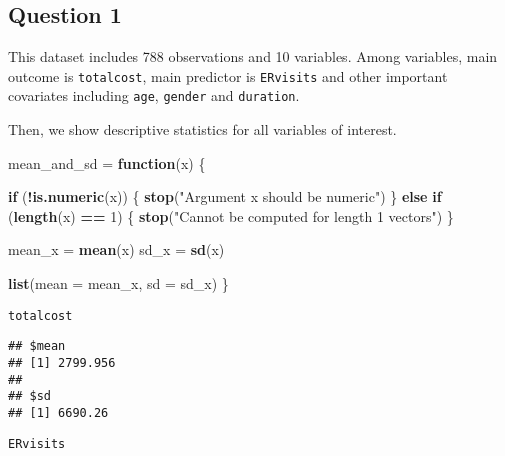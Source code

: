 \documentclass[]{article}
\newenvironment{Shaded}{\begin{snugshade}}{\end{snugshade}}
\newcommand{\KeywordTok}[1]{\textcolor[rgb]{0.13,0.29,0.53}{\textbf{#1}}}
\newcommand{\DataTypeTok}[1]{\textcolor[rgb]{0.13,0.29,0.53}{#1}}
\newcommand{\DecValTok}[1]{\textcolor[rgb]{0.00,0.00,0.81}{#1}}
\newcommand{\StringTok}[1]{\textcolor[rgb]{0.31,0.60,0.02}{#1}}
\newcommand{\ControlFlowTok}[1]{\textcolor[rgb]{0.13,0.29,0.53}{\textbf{#1}}}
\newcommand{\OperatorTok}[1]{\textcolor[rgb]{0.81,0.36,0.00}{\textbf{#1}}}
\newcommand{\NormalTok}[1]{#1}
\begin{document}
\subsection{Question 1}\label{question-1-1}

This dataset includes 788 observations and 10 variables. Among
variables, main outcome is \texttt{totalcost}, main predictor is
\texttt{ERvisits} and other important covariates including \texttt{age},
\texttt{gender} and \texttt{duration}.

Then, we show descriptive statistics for all variables of interest.

\begin{Shaded}
\begin{Highlighting}[]
\NormalTok{mean_and_sd =}\StringTok{ }\ControlFlowTok{function}\NormalTok{(x) \{}
  
  \ControlFlowTok{if}\NormalTok{ (}\OperatorTok{!}\KeywordTok{is.numeric}\NormalTok{(x)) \{}
    \KeywordTok{stop}\NormalTok{(}\StringTok{"Argument x should be numeric"}\NormalTok{)}
\NormalTok{  \} }\ControlFlowTok{else} \ControlFlowTok{if}\NormalTok{ (}\KeywordTok{length}\NormalTok{(x) }\OperatorTok{==}\StringTok{ }\DecValTok{1}\NormalTok{) \{}
    \KeywordTok{stop}\NormalTok{(}\StringTok{"Cannot be computed for length 1 vectors"}\NormalTok{)}
\NormalTok{  \}}
  
\NormalTok{  mean_x =}\StringTok{ }\KeywordTok{mean}\NormalTok{(x)}
\NormalTok{  sd_x =}\StringTok{ }\KeywordTok{sd}\NormalTok{(x)}

  \KeywordTok{list}\NormalTok{(}\DataTypeTok{mean =}\NormalTok{ mean_x, }
       \DataTypeTok{sd =}\NormalTok{ sd_x)}
\NormalTok{\}}
\end{Highlighting}
\end{Shaded}

\texttt{totalcost}

\begin{Shaded}
\end{Shaded}

\begin{verbatim}
## $mean
## [1] 2799.956
## 
## $sd
## [1] 6690.26
\end{verbatim}

\texttt{ERvisits}

\begin{Shaded}
\end{Shaded}
\end{document}
